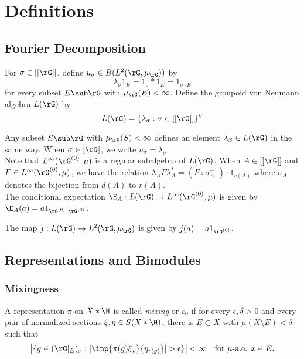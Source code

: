 \documentclass[../main.tex]{subfiles}
\begin{document}
\section{Definitions}

\subsection{Fourier Decomposition}
For $ \sigma\in [[\rG]] $, define $ u_{\sigma}\in B(L^{2}(\rG, \mu_{\rG})) $ by
\[
    \lambda_{\sigma} 1_E = 1_\sigma \ast 1_E = 1_{\sigma \cdot E}
\]
for every subset $ E\sub \rG $ with $ \mu_{\rG}(E)<\infty $. Define the groupoid von Neumann algebra $ L(\rG) $ by 
\[
    L(\rG) = \{\lambda_{\sigma}: \sigma\in [[\rG]]\}^{\prime\prime}
\]

Any subset $ S\sub \rG $ with $ \mu_{\rG}(S)<\infty $ defines an element $ \lambda_{S}\in L(\rG) $ in the same way. When $ \sigma \in[\rG]$, we write $ u_{\sigma}= \lambda_{\sigma} $. \\





Note that $ L^{\infty}(\rG^{(0)} ,\mu)$ is a regular subalgebra of $ L(\rG) $. When $ A\in [[\rG]]$ and $ F\in L^{\infty}(\rG^{(0)},\mu) $, we have the relation $ \lambda_{A}F \lambda_{A}^{*} = (F\circ \sigma_{A}^{-1} )\cdot 1_{r(A)}  $ where $ \sigma_{A} $ denotes the bijection from $ d(A) $ to $ r(A) $.\\


The conditional expectation $ \E_{A}:L(\rG)\to L^{\infty}(\rG^{(0)},\mu) $ is given by $ \E_{A}(a) = a 1_{\rG^{(0)}} \vert_{\rG^{(0)}} $. 

The map $ j:L(\rG)\to L^{2}(\rG,\mu_{\rG}) $ is given by $j(a) = a1_{\rG^{(0)}}$.
\subsection{Representations and Bimodules}
\subsubsection{Mixingness}
\begin{definition}
 A representation $\pi$ on $X \ast \H$ is called {\it mixing} or $c_0$ if 
for every $\epsilon, \delta > 0$ and every pair of normalized sections $\xi, \eta \in S(X \ast \H)$, there is $E \subset X$ with $\mu(X \setminus E) < \delta$ such that 
$$
\left|\{g \in (\rG\vert_E)_x : |\inp{\pi(g)\xi_x}{\eta_{r(g)}}| > \epsilon\}\right| < \infty  \quad \text{for $\mu$-a.e. $x \in E$.}
$$
\end{definition}
\end{document}
